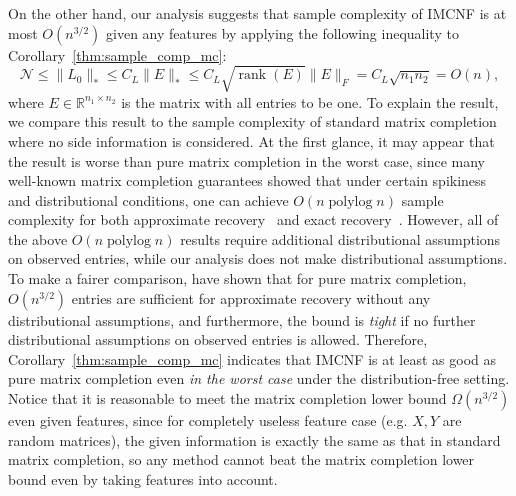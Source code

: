 \documentclass[twoside,11pt]{article}
\def\R{\mathbb{R}}
\newcommand\rank[1]{{\operatorname{rank}}(#1)}
\def\nmax{{\mathcal N}}
\newcommand\polylog[1]{\operatorname{polylog}{#1}}
\def\realL{L_0}
\begin{document}
On the other hand, our analysis suggests that
sample complexity of IMCNF is at most $O(n^{3/2})$ given any features by applying
the following inequality to Corollary~\ref{thm:sample_comp_mc}:
\begin{equation*}
  \nmax \leq \|\realL\|_* \leq C_L \|E\|_* \leq C_L\sqrt{\rank{E}}\|E\|_F = C_L\sqrt{n_1n_2} = O(n),
\end{equation*}
where $E\in\R^{n_1\times n_2}$ is the matrix with all entries to be one.
To explain the result, we compare this result to the sample complexity of
standard matrix completion where no side information is considered.
At the first glance, it may appear that the result is worse than pure matrix completion
in the worst case,
since many well-known matrix completion guarantees showed that
under certain spikiness and distributional conditions, one can achieve $O(n \polylog{n})$
sample complexity for both approximate recovery~\citep{Srebro05a, SN12a}
and exact recovery~\citep{Candes12a}.
However, all of the above $O(n\polylog{n})$ results
require additional distributional assumptions on observed entries,
while our analysis does not make distributional assumptions.
To make a fairer comparison,
\citet{Shamir14a} have shown that for pure matrix completion,
$O(n^{3/2})$ entries are sufficient for approximate recovery without any distributional
assumptions, and furthermore,
the bound is {\it tight} if no further distributional assumptions on observed entries is allowed.
Therefore,
Corollary~\ref{thm:sample_comp_mc} indicates that IMCNF is at least as good
as pure matrix completion even {\it in the worst case} under the distribution-free setting.
Notice that it is reasonable to meet the matrix completion lower
bound $\Omega(n^{3/2})$ even given features,
since for completely useless feature case (e.g. $X, Y$ are random matrices),
the given information is exactly the same as that in standard matrix completion,
so any method cannot beat the matrix completion lower bound even by taking features into account.
\end{document}
